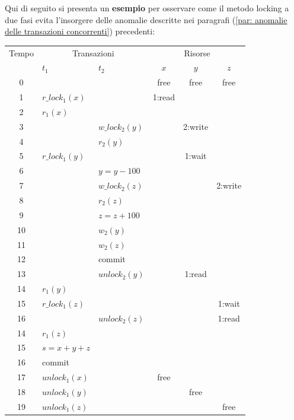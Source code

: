 \documentclass[a4paper]{article}
\begin{document}
	\noindent
	Qui di seguito si presenta un \textcolor{Green4}{\textbf{esempio}} per osservare come il metodo locking a due fasi evita l'insorgere delle anomalie descritte nei paragrafi (\ref{par: anomalie delle transazioni concorrenti}) precedenti:
	\begin{table}[!htbp]
		\centering
		\begin{tabular}{@{} c l l c c c @{}}
			\toprule
			Tempo & \multicolumn{2}{c}{Transazioni} & \multicolumn{3}{c}{Risorse} \\ \cmidrule{2-6}
				  & $t_{1}$ & $t_{2}$ & $x$ & $y$ & $z$ \\
			\midrule
			0	&								&								& free	& free		& free		\\
			1	& $r\_lock_{1}\left(x\right)$	&								& 1:read& 			&			\\
			2	& $r_{1}\left(x\right)$			&								& 		&			&			\\
			3	& 								& $w\_lock_{2}\left(y\right)$	& 		& 2:write	&			\\
			4	&								& $r_{2}\left(y\right)$ 		&		&			&			\\
			5	& $r\_lock_{1}\left(y\right)$	& 								&		& 1:wait	&			\\
			6	& 								& $y = y - 100$ 				&		&			&			\\
			7	& 								& $w\_lock_{2}\left(z\right)$ 	&		&			& 2:write	\\
			8	&								& $r_{2}\left(z\right)$			&		&			&			\\
			9	& 								& $z = z + 100$ 				&		&			&			\\
			10	& 								& $w_{2}\left(y\right)$ 		&		&			&			\\
			11	& 								& $w_{2}\left(z\right)$ 		&		&			&			\\
			12	& 								& \textsf{commit} 				&		&			&			\\
			13	& 								& $unlock_{2}\left(y\right)$	&		& 1:read	&			\\
			14	& $r_{1}\left(y\right)$			& 								&		&			&			\\
			15	& $r\_lock_{1}\left(z\right)$	& 								&		&			& 1:wait	\\
			16  &								& $unlock_{2}\left(z\right)$ 	&		&			& 1:read	\\
			14	& $r_{1}\left(z\right)$			& 								&		&			&			\\
			15	& $s = x+y+z$					& 								&		&			&			\\
			16	& \textsf{commit}				& 								&		&			&			\\
			17	& $unlock_{1}\left(x\right)$	& 								& free	&			&			\\
			18	& $unlock_{1}\left(y\right)$	& 								&		& free		&			\\
			19	& $unlock_{1}\left(z\right)$	& 								&		&			& free		\\
			\bottomrule
		\end{tabular}
	\end{table}
	
\end{document}
